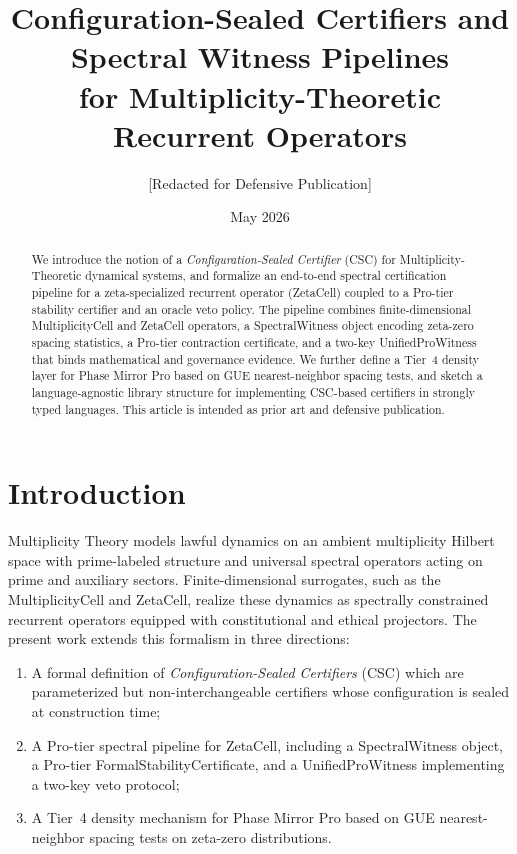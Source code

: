 \documentclass[11pt]{article}
\title{Configuration-Sealed Certifiers and Spectral Witness Pipelines \\
for Multiplicity-Theoretic Recurrent Operators}
\author{[Redacted for Defensive Publication]}
\date{May 2026}
\begin{document}
\maketitle

\begin{abstract}
We introduce the notion of a \emph{Configuration-Sealed Certifier} (CSC) for
Multiplicity-Theoretic dynamical systems, and formalize an end-to-end
spectral certification pipeline for a zeta-specialized recurrent operator
(ZetaCell) coupled to a Pro-tier stability certifier and an oracle veto
policy. The pipeline combines finite-dimensional MultiplicityCell and
ZetaCell operators, a SpectralWitness object encoding zeta-zero spacing
statistics, a Pro-tier contraction certificate, and a two-key UnifiedProWitness
that binds mathematical and governance evidence. We further define a Tier~4
density layer for Phase Mirror Pro based on GUE nearest-neighbor spacing
tests, and sketch a language-agnostic library structure for implementing
CSC-based certifiers in strongly typed languages. This article is intended as
prior art and defensive publication.
\end{abstract}
\newpage
\tableofcontents

\section{Introduction}

Multiplicity Theory models lawful dynamics on an ambient multiplicity
Hilbert space with prime-labeled structure and universal spectral
operators acting on prime and auxiliary sectors.
Finite-dimensional surrogates, such as the MultiplicityCell and ZetaCell,
realize these dynamics as spectrally constrained recurrent operators
equipped with constitutional and ethical projectors.
The present work extends this formalism in three directions:
\begin{enumerate}[label=(\alph*)]
  \item A formal definition of \emph{Configuration-Sealed Certifiers} (CSC)
        which are parameterized but non-interchangeable certifiers whose
        configuration is sealed at construction time;
  \item A Pro-tier spectral pipeline for ZetaCell, including a
        SpectralWitness object, a Pro-tier FormalStabilityCertificate,
        and a UnifiedProWitness implementing a two-key veto protocol;
  \item A Tier~4 density mechanism for Phase Mirror Pro based on GUE
        nearest-neighbor spacing tests on zeta-zero distributions.
\end{enumerate}
\end{document}
